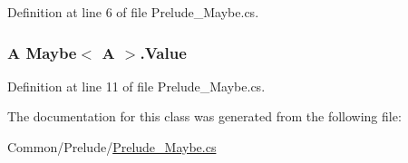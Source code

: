 Definition at line 6 of file Prelude\+\_\+\+Maybe.\+cs.

\hypertarget{class_maybe_3_01_a_01_4_a9398da8d668f30dfeb8c0aea0872711e}{
\subsubsection[{Value}]{\setlength{\rightskip}{0pt plus 5cm}A Maybe$<$ A $>$.Value\hspace{0.3cm}{\ttfamily [get]}}}\label{class_maybe_3_01_a_01_4_a9398da8d668f30dfeb8c0aea0872711e}


Definition at line 11 of file Prelude\+\_\+\+Maybe.\+cs.



The documentation for this class was generated from the following file\+:\begin{DoxyCompactItemize}
\item 
Common/\+Prelude/\hyperlink{_prelude___maybe_8cs}{Prelude\+\_\+\+Maybe.\+cs}\end{DoxyCompactItemize}
